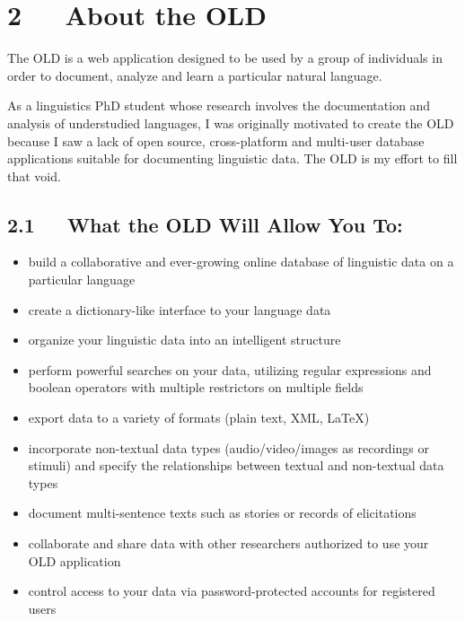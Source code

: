 \documentclass[letterpaper,10pt,english]{sphinxmanual}
\begin{document}
\chapter{2   About the OLD}
\label{user_guide:about-the-old}
The OLD is a web application designed to be used by a group of individuals in
order to document, analyze and learn a particular natural language.

As a linguistics PhD student whose research involves the documentation and
analysis of understudied languages, I was originally motivated to create the
OLD because I saw a lack of open source, cross-platform and multi-user database
applications suitable for documenting linguistic data.  The OLD is my effort to
fill that void.


\section{2.1   What the OLD Will Allow You To:}
\label{user_guide:what-the-old-will-allow-you-to}\begin{itemize}
\item {} 
build a collaborative and ever-growing online database of linguistic data on a
particular language

\item {} 
create a dictionary-like interface to your language data

\item {} 
organize your linguistic data into an intelligent structure

\item {} 
perform powerful searches on your data, utilizing regular expressions and
boolean operators with multiple restrictors on multiple fields

\item {} 
export data to a variety of formats (plain text, XML, LaTeX)

\item {} 
incorporate non-textual data types (audio/video/images as recordings or
stimuli) and specify the relationships between textual and non-textual data
types

\item {} 
document multi-sentence texts such as stories or records of elicitations

\item {} 
collaborate and share data with other researchers authorized to use your OLD
application

\item {} 
control access to your data via password-protected accounts for registered
users

\end{itemize}
\end{document}
